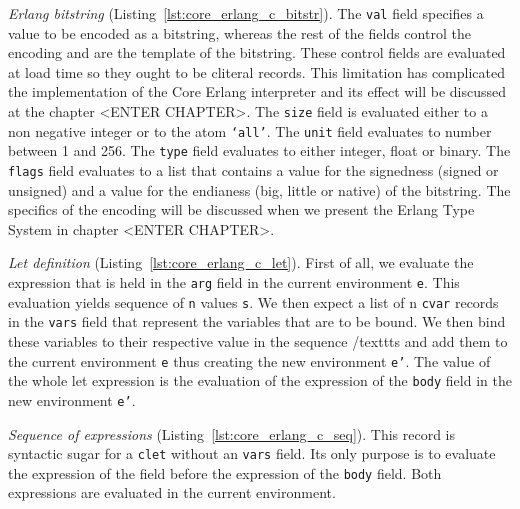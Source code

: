 \emph{Erlang bitstring} (Listing~\ref{lst:core_erlang_c_bitstr}).
The \texttt{val} field specifies a value to be encoded as a bitstring, whereas the rest
of the fields control the encoding and are the template of the bitstring. These
control fields are evaluated at load time so they ought to be c\textunderscore literal
records. This limitation has complicated the implementation of the Core Erlang
interpreter and its effect will be discussed at the chapter <ENTER CHAPTER>.
The \texttt{size} field is evaluated either to a non negative integer or to the atom
\texttt{‘all’}. The \texttt{unit} field evaluates to number between 1 and 256. The \texttt{type} field
evaluates to either integer, float or binary. The \texttt{flags} field evaluates to a
list that contains a value for the signedness (signed or unsigned) and a value
for the endianess (big, little or native) of the bitstring. The specifics of
the encoding will be discussed when we present the Erlang Type System in
chapter <ENTER CHAPTER>.


\emph{Let definition} (Listing~\ref{lst:core_erlang_c_let}).
First of all, we evaluate the expression that is held in the \texttt{arg} field in the
current environment \texttt{e}. This evaluation yields sequence of \texttt{n} values \texttt{s}. We then
expect a list of n \texttt{c\textunderscore var} records in the \texttt{vars} field that represent the variables
that are to be bound. We then bind these variables to their respective value in
the sequence /texttt{s} and add them to the current environment \texttt{e} thus creating the new
environment \texttt{e’}. The value of the whole let expression is the evaluation of the
expression of the \texttt{body} field in the new environment \texttt{e’}.



\emph{Sequence of expressions} (Listing~\ref{lst:core_erlang_c_seq}).
This record is syntactic sugar for a \texttt{c\textunderscore let} without an
\texttt{vars} field. Its only purpose is to evaluate the expression of the
 field before the expression of the \texttt{body} field. Both
expressions are evaluated in the current environment.


